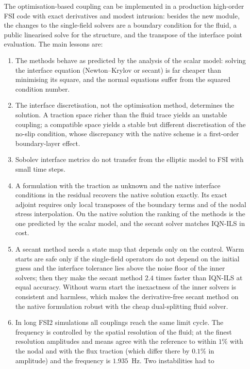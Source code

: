 \documentclass[11pt,a4paper]{article}
\theoremstyle{definition}
\theoremstyle{remark}
\begin{document}
The optimisation-based coupling can be implemented in a production high-order FSI code with exact
derivatives and modest intrusion: besides the new module, the changes to the single-field solvers
are a  boundary condition for the fluid, a public linearised solve for the
structure, and the transpose of the interface point evaluation. The main lessons are:
\begin{enumerate}
\item The methods behave as predicted by the analysis of the scalar model: solving the interface
equation (Newton--Krylov or secant) is far cheaper than minimising its square, and the normal
equations suffer from the squared condition number.
\item The interface discretisation, not the optimisation method, determines the solution. A
traction space richer than the fluid trace yields an unstable coupling; a compatible space yields
a stable but different discretisation of the no-slip condition, whose discrepancy with the native
scheme is a first-order boundary-layer effect.
\item Sobolev interface metrics do not transfer from the elliptic model to FSI with small time
steps.
\item A formulation with the traction as unknown and the native interface conditions in the
residual recovers the native solution exactly. Its exact adjoint requires only local transposes of
the boundary terms and of the nodal stress interpolation. On the native solution the ranking of the
methods is the one predicted by the scalar model, and the secant solver matches IQN-ILS in cost.
\item A secant method needs a state map that depends only on the control. Warm starts are safe
only if the single-field operators do not depend on the initial guess and the interface tolerance
lies above the noise floor of the inner solvers; then they make the secant method $2.4$ times
faster than IQN-ILS at equal accuracy. Without warm start the inexactness of the inner solvers is
consistent and harmless, which makes the derivative-free secant method on the native formulation
robust with the cheap dual-splitting fluid solver.
\item In long FSI2 simulations all couplings reach the same limit cycle. The frequency is
controlled by the spatial resolution of the fluid; at the finest resolution amplitudes and means
agree with the reference to within $1\%$ with the nodal and with the flux traction (which differ
there by $0.1\%$ in amplitude) and the frequency is $1.935$~Hz. Two instabilities had to

\end{enumerate}
\end{document}
